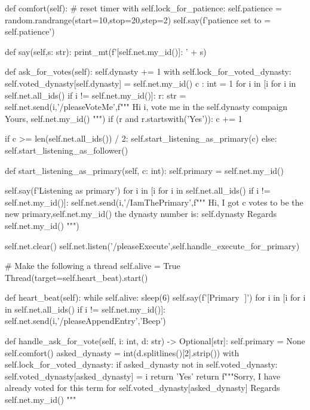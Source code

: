 \begin{simplepy}
    def comfort(self):          # reset timer
        with self.lock_for_patience:
            self.patience = random.randrange(start=10,stop=20,step=2)
            self.say(f'patience set to = {self.patience}')

    def say(self,s: str):
        print_mt(f'[{self.net.my_id()}]: ' + s)

    def ask_for_votes(self):
        self.dynasty += 1
        with self.lock_for_voted_dynasty:
            self.voted_dynasty[self.dynasty] = self.net.my_id()
        c : int = 1
        for i in [i for i in self.net.all_ids() if i != self.net.my_id()]:
            r: str = self.net.send(i,'/pleaseVoteMe',f"""
            Hi {i}, vote me in the
               {self.dynasty}
                     compaign
                       Yours, {self.net.my_id()}
            """)
            if (r and r.startswith('Yes')):
                c += 1

        if c >= len(self.net.all_ids()) / 2:
            self.start_listening_as_primary(c)
        else:
            self.start_listening_as_follower()

    def start_listening_as_primary(self, c: int):
        self.primary = self.net.my_id()

        self.say(f'Listening as primary')
        for i in [i for i in self.net.all_ids() if i != self.net.my_id()]:
            self.net.send(i,'/IamThePrimary',f"""
            Hi, I got {c} votes to be the new primary,{self.net.my_id()}
                the dynasty number is:
                   {self.dynasty}
                               Regards {self.net.my_id()}
            """)

        self.net.clear()
        self.net.listen('/pleaseExecute',self.handle_execute_for_primary)



        # Make the following a thread
        self.alive = True
        Thread(target=self.heart_beat).start()

    def heart_beat(self):
        while self.alive:
            sleep(6)
            self.say(f'[Primary 💙]')
            for i in [i for i in self.net.all_ids() if i != self.net.my_id()]:
                self.net.send(i,'/pleaseAppendEntry','Beep')


    def handle_ask_for_vote(self, i: int, d: str) -> Optional[str]:
        self.primary = None
        self.comfort()
        asked_dynasty = int(d.splitlines()[2].strip())
        with self.lock_for_voted_dynasty:
            if asked_dynasty not in self.voted_dynasty:
                self.voted_dynasty[asked_dynasty] = i
                return 'Yes'
        return f"""Sorry,
              I have already voted for this term for
                     {self.voted_dynasty[asked_dynasty]}
                               Regards {self.net.my_id()}
        """


\end{simplepy}

